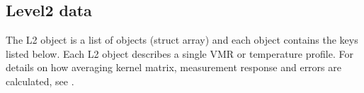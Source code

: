 \subsection{Level2 data}

The L2 object is a list of objects (struct array) and each object contains the
keys listed below. Each L2 object describes a single VMR or temperature
profile. For details on how averaging kernel matrix, measurement response and
errors are calculated, see \citep{atbdl2}.

\begin{itemize}


\end{itemize}
